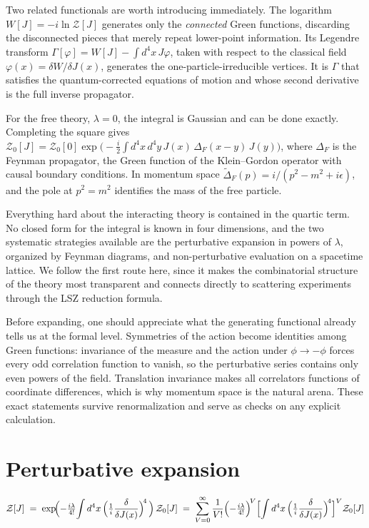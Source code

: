 \documentclass[twocolumn]{article}
\begin{document}
Two related functionals are worth introducing immediately. The logarithm
$W[J] = -i\ln\mathcal{Z}[J]$ generates only the \emph{connected} Green
functions, discarding the disconnected pieces that merely repeat
lower-point information. Its Legendre transform
$\Gamma[\varphi] = W[J] - \int d^4x\, J\varphi$, taken with respect to
the classical field $\varphi(x) = \delta W/\delta J(x)$, generates the
one-particle-irreducible vertices. It is $\Gamma$ that satisfies the
quantum-corrected equations of motion and whose second derivative is the
full inverse propagator.

For the free theory, $\lambda = 0$, the integral is Gaussian and can be
done exactly. Completing the square gives
$\mathcal{Z}_0[J] = \mathcal{Z}_0[0]\exp\bigl(-\tfrac{i}{2}\int d^4x\,
d^4y\, J(x)\,\Delta_F(x-y)\,J(y)\bigr)$,
where $\Delta_F$ is the Feynman propagator, the Green function of the
Klein--Gordon operator with causal boundary conditions. In momentum
space $\tilde\Delta_F(p) = i/(p^2 - m^2 + i\epsilon)$, and the pole at
$p^2 = m^2$ identifies the mass of the free particle.

Everything hard about the interacting theory is contained in the quartic
term. No closed form for the integral is known in four dimensions, and
the two systematic strategies available are the perturbative expansion
in powers of $\lambda$, organized by Feynman diagrams, and
non-perturbative evaluation on a spacetime lattice. We follow the first
route here, since it makes the combinatorial structure of the theory
most transparent and connects directly to scattering experiments through
the LSZ reduction formula.

Before expanding, one should appreciate what the generating functional
already tells us at the formal level. Symmetries of the action become
identities among Green functions: invariance of the measure and the
action under $\phi \to -\phi$ forces every odd correlation function to
vanish, so the perturbative series contains only even powers of the
field. Translation invariance makes all correlators functions of
coordinate differences, which is why momentum space is the natural
arena. These exact statements survive renormalization and serve as
checks on any explicit calculation.

\clearpage
\section{Perturbative expansion}

\begin{wideband}
\begin{equation}
  \mathcal{Z}[J] \;=\;
  \exp\!\Bigl(-\tfrac{i\lambda}{4!}\!\int d^4x\,
  \Bigl(\tfrac{1}{i}\frac{\delta}{\delta J(x)}\Bigr)^{\!4}\,\Bigr)\,
  \mathcal{Z}_0[J]
  \;=\; \sum_{V=0}^{\infty}\frac{1}{V!}
  \Bigl(-\tfrac{i\lambda}{4!}\Bigr)^{\!V}
  \Bigl[\int d^4x\,
  \Bigl(\tfrac{1}{i}\frac{\delta}{\delta J(x)}\Bigr)^{\!4}\Bigr]^V
  \mathcal{Z}_0[J]
  \label{eq:pert}
\end{equation}
\end{wideband}
\end{document}
